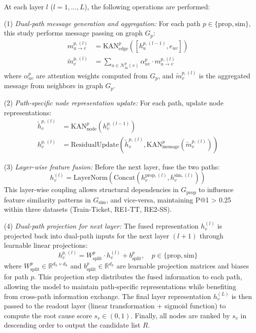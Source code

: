 \documentclass[conference]{IEEEtran}
\begin{document}
At each layer $l$ ($l = 1, ..., L$), the following operations are performed:

(1) \textit{Dual-path message generation and aggregation:} For each path $p \in \{\text{prop}, \text{sim}\}$, this study performs message passing on graph $G_p$:
\begin{align}
m_{u \to v}^{p, (l)} &= \text{KAN}_{\text{edge}}^{p}([h_u^{p, (l-1)}, e_{uv}]) \\
\tilde{m}_v^{p, (l)} &= \sum_{u \in \mathcal{N}_{\text{in}}^p(v)} \alpha_{uv}^{p} \cdot m_{u \to v}^{p, (l)}
\end{align}
where $\alpha_{uv}^{p}$ are attention weights computed from $G_p$, and $\tilde{m}_v^{p, (l)}$ is the aggregated message from neighbors in graph $G_p$.

(2) \textit{Path-specific node representation update:} For each path, update node representations:
\begin{align}
\tilde{h}_v^{p, (l)} &= \text{KAN}_{\text{node}}^{p}(h_v^{p, (l-1)}) \\
h_v^{p, (l)} &= \text{ResidualUpdate}(\tilde{h}_v^{p, (l)}, \text{KAN}_{\text{message}}^{p}(\tilde{m}_v^{p, (l)}))
\end{align}

(3) \textit{Layer-wise feature fusion:} Before the next layer, fuse the two paths:
\begin{equation}
h_v^{(l)} = \text{LayerNorm}(\text{Concat}(h_v^{\text{prop}, (l)}, h_v^{\text{sim}, (l)}))
\label{eq:fusion}
\end{equation}
This layer-wise coupling allows structural dependencies in $G_{\text{prop}}$ to influence feature similarity patterns in $G_{\text{sim}}$, and vice-versa, maintaining P@1 > 0.25 within three datasets (Train-Ticket, RE1-TT, RE2-SS).

(4) \textit{Dual-path projection for next layer:} The fused representation $h_v^{(l)}$ is projected back into dual-path inputs for the next layer $(l+1)$ through learnable linear projections:
\begin{equation}
h_v^{p, (l)} = W_{\text{split}}^{p} \cdot h_v^{(l)} + b_{\text{split}}^{p}, \quad p \in \{\text{prop}, \text{sim}\}
\label{eq:projection}
\end{equation}
where $W_{\text{split}}^{p} \in \mathbb{R}^{d_h \times d_h}$ and $b_{\text{split}}^{p} \in \mathbb{R}^{d_h}$ are learnable projection matrices and biases for path $p$. This projection step distributes the fused information to each path, allowing the model to maintain path-specific representations while benefiting from cross-path information exchange. The final layer representation $h_v^{(L)}$ is then passed to the readout layer (linear transformation + sigmoid function) to compute the root cause score $s_v \in (0, 1)$. Finally, all nodes are ranked by $s_v$ in descending order to output the candidate list $R$.
\end{document}
